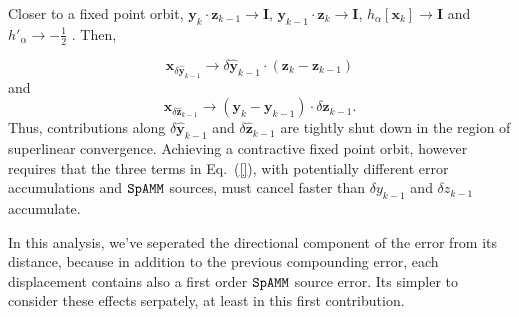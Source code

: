 \documentclass[letterpaper,twocolumn,amsmath,amsfont,amssymb,english,aps,jcp,preprintnumbers,groupaddress,nofootinbib,tightenlines,floatfix]{revtex4}
\newcommand{\mat}[1]{\boldsymbol{#1}}
\theoremstyle{plain}
\theoremstyle{remark}
\theoremstyle{plain}
\begin{document}
Closer to a fixed point orbit,  $\mat{y}_k \cdot \mat{z}_{k-1} \rightarrow \mat{I}$, $\mat{y}_{k-1} \cdot \mat{z}_{k} \rightarrow \mat{I}$,
$h_\alpha \left[ \mat{x}_{k} \right] \rightarrow \mat{I}$ and $h'_\alpha \rightarrow - \frac{1}{2}$ \cite{higham2005}.  Then,

\begin{equation} \label{yorbit}
 \mat{x}_{\delta \widehat{ \mat{y}}_{k-1}} \rightarrow \delta \widehat{\mat{y}}_{k-1} \cdot \left( \mat{z}_k-\mat{z}_{k-1} \right)
\end{equation}
and
\begin{equation} \label{zorbit}
 \mat{x}_{\delta \widehat{ \mat{z}}_{k-1}} \rightarrow \left( \mat{y}_k-\mat{y}_{k-1} \right) \cdot \delta \widehat{\mat{z}}_{k-1} .
\end{equation}
Thus, contributions along $\delta \widehat{\mat{y}}_{k-1}$ and $\delta \widehat{\mat{z}}_{k-1}$ are tightly shut down in the 
region of superlinear convergence.  Achieving a contractive fixed point orbit, however requires that the three terms in Eq.~(\ref{}),  
with potentially different error accumulations and $\tt SpAMM$ sources, must cancel faster than $\delta y_{k-1}$ 
and $\delta z_{k-1}$ accumulate.

In this analysis, we've seperated the directional component of the error from its distance, because in addition to the
previous compounding error, each displacement contains also a first order $\tt SpAMM$ source error.  Its simpler to 
consider these effects serpately, at least in this first contribution. 
\end{document}
